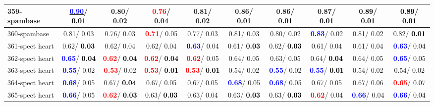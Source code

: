 \begin{table}[h]
\begin{center}
{\begin{tabular}{lc|c|c|c|c|c|c|c|c}
359-spambase & \underline{\textcolor{blue}{\textbf{  0.90}}}/\textcolor{black}{\textbf{  0.01}} &   0.80/  0.02 & \textcolor{red}{\textbf{  0.76}}/  0.04 &   0.81/  0.02 &   0.86/\textcolor{black}{\textbf{  0.01}} &   0.86/\textcolor{black}{\textbf{  0.01}} &   0.87/\textcolor{black}{\textbf{  0.01}} & \textcolor{black}{\textbf{  0.89}}/\textcolor{black}{\textbf{  0.01}} & \textcolor{black}{\textbf{  0.89}}/\textcolor{black}{\textbf{  0.01}} \\ \hline
360-spambase &   0.81/  0.03 &   0.76/  0.03 & \textcolor{red}{\textbf{  0.71}}/  0.05 &   0.77/  0.03 &   0.81/  0.03 &   0.80/  0.02 & \textcolor{blue}{\textbf{  0.83}}/  0.02 &   0.81/  0.02 &   0.82/\textcolor{black}{\textbf{  0.01}} \\
361-spect heart &   0.62/\textcolor{black}{\textbf{  0.03}} &   0.62/  0.04 &   0.62/  0.04 & \textcolor{blue}{\textbf{  0.63}}/  0.04 &   0.61/\textcolor{black}{\textbf{  0.03}} &   0.62/\textcolor{black}{\textbf{  0.03}} &   0.61/  0.04 &   0.61/  0.04 & \textcolor{blue}{\textbf{  0.63}}/  0.04 \\
362-spect heart & \textcolor{blue}{\textbf{  0.65}}/\textcolor{black}{\textbf{  0.04}} & \textcolor{red}{\textbf{  0.62}}/\textcolor{black}{\textbf{  0.04}} & \textcolor{red}{\textbf{  0.62}}/\textcolor{black}{\textbf{  0.04}} & \textcolor{red}{\textbf{  0.62}}/  0.05 &   0.64/  0.05 &   0.63/  0.05 &   0.64/\textcolor{black}{\textbf{  0.04}} &   0.64/  0.05 & \textcolor{blue}{\textbf{  0.65}}/  0.05 \\
363-spect heart & \textcolor{blue}{\textbf{  0.55}}/  0.02 & \textcolor{red}{\textbf{  0.53}}/  0.02 & \textcolor{red}{\textbf{  0.53}}/\textcolor{black}{\textbf{  0.01}} & \textcolor{red}{\textbf{  0.53}}/\textcolor{black}{\textbf{  0.01}} &   0.54/  0.02 & \textcolor{blue}{\textbf{  0.55}}/  0.02 & \textcolor{blue}{\textbf{  0.55}}/\textcolor{black}{\textbf{  0.01}} &   0.54/  0.02 &   0.54/  0.02 \\
364-spect heart & \textcolor{blue}{\textbf{  0.68}}/  0.05 &   0.67/\textcolor{black}{\textbf{  0.04}} &   0.67/  0.05 &   0.67/  0.05 & \textcolor{blue}{\textbf{  0.68}}/  0.05 & \textcolor{blue}{\textbf{  0.68}}/  0.05 &   0.67/  0.05 &   0.67/  0.06 & \textcolor{red}{\textbf{  0.65}}/  0.07 \\
365-spect heart & \textcolor{blue}{\textbf{  0.66}}/  0.05 & \textcolor{red}{\textbf{  0.62}}/\textcolor{black}{\textbf{  0.03}} &   0.63/\textcolor{black}{\textbf{  0.03}} &   0.63/  0.04 &   0.63/\textcolor{black}{\textbf{  0.03}} &   0.63/\textcolor{black}{\textbf{  0.03}} & \textcolor{red}{\textbf{  0.62}}/  0.04 & \textcolor{blue}{\textbf{  0.66}}/  0.04 & \textcolor{blue}{\textbf{  0.66}}/  0.04 \\

\end{tabular}}
\end{center}
\end{table}
